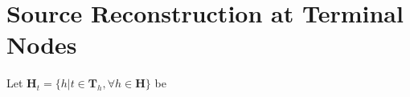\documentclass{article}
\begin{document}
\printAffiliationsAndNotice{\icmlEqualContribution} %

 
\appendix


\section{Source Reconstruction at Terminal Nodes }%
\label{sec:decoding}


Let 
$\mathbf H_t = \{ h | t \in \mathbf T_h, \forall h \in \mathbf H \}$ 
be 



\end{document}
